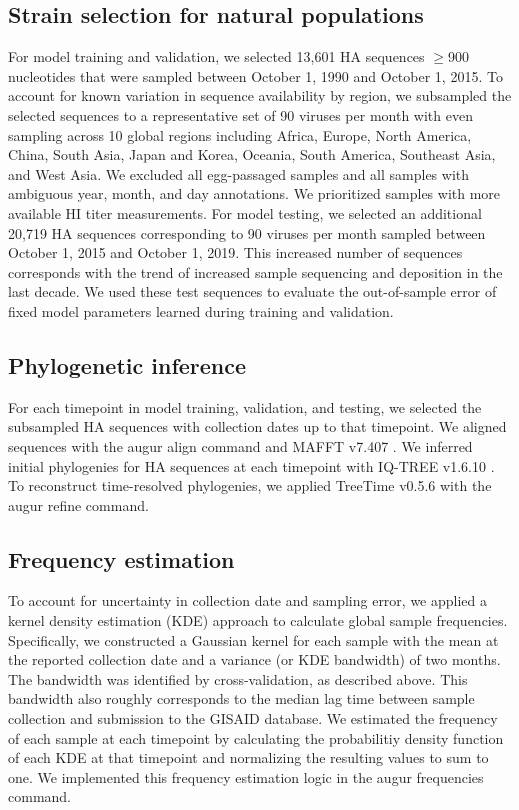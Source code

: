 \subsection*{Strain selection for natural populations}

For model training and validation, we selected 13,601 HA sequences $\geq$900 nucleotides that were sampled between October 1, 1990 and October 1, 2015.
To account for known variation in sequence availability by region, we subsampled the selected sequences to a representative set of 90 viruses per month with even sampling across 10 global regions including Africa, Europe, North America, China, South Asia, Japan and Korea, Oceania, South America, Southeast Asia, and West Asia.
We excluded all egg-passaged samples and all samples with ambiguous year, month, and day annotations.
We prioritized samples with more available HI titer measurements.
For model testing, we selected an additional 20,719 HA sequences corresponding to 90 viruses per month sampled between October 1, 2015 and October 1, 2019.
This increased number of sequences corresponds with the trend of increased sample sequencing and deposition in the last decade.
We used these test sequences to evaluate the out-of-sample error of fixed model parameters learned during training and validation.

\subsection*{Phylogenetic inference}

For each timepoint in model training, validation, and testing, we selected the subsampled HA sequences with collection dates up to that timepoint.
We aligned sequences with the augur align command \cite{Hadfield2018} and MAFFT v7.407 \cite{Katoh2002}.
We inferred initial phylogenies for HA sequences at each timepoint with IQ-TREE v1.6.10 \cite{Nguyen2014}.
To reconstruct time-resolved phylogenies, we applied TreeTime v0.5.6 \cite{Sagulenko2018} with the augur refine command.

\subsection*{Frequency estimation}

To account for uncertainty in collection date and sampling error, we applied a kernel density estimation (KDE) approach to calculate global sample frequencies.
Specifically, we constructed a Gaussian kernel for each sample with the mean at the reported collection date and a variance (or KDE bandwidth) of two months.
The bandwidth was identified by cross-validation, as described above.
This bandwidth also roughly corresponds to the median lag time between sample collection and submission to the GISAID database.
We estimated the frequency of each sample at each timepoint by calculating the probabilitiy density function of each KDE at that timepoint and normalizing the resulting values to sum to one.
We implemented this frequency estimation logic in the augur frequencies command.

